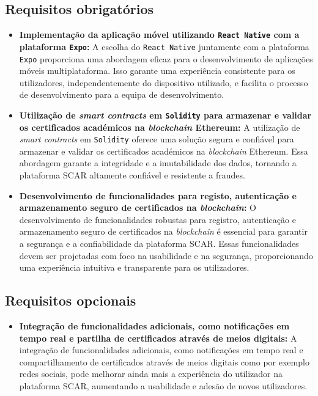 \documentclass[10pt]{article}
\begin{document}
\subsection*{Requisitos obrigatórios}

\begin{itemize}

    \item\textbf{Implementação da aplicação móvel utilizando \texttt{React Native} com a plataforma \texttt{Expo}:} A escolha do \texttt{React Native}
          juntamente com a plataforma \texttt{Expo} proporciona uma abordagem eficaz para o desenvolvimento de aplicações móveis
          multiplataforma. Isso garante uma experiência consistente para os utilizadores, independentemente do dispositivo
          utilizado, e facilita o processo de desenvolvimento para a equipa de desenvolvimento.

    \item\textbf{Utilização de \textit{smart contracts}  em \texttt{Solidity} para armazenar e validar os certificados académicos na \textit{blockchain}
              Ethereum:} A utilização de \textit{smart contracts} em \texttt{Solidity} oferece uma solução segura e confiável para armazenar
          e validar os certificados académicos na \textit{blockchain} Ethereum. Essa abordagem garante a integridade e a
          imutabilidade dos dados, tornando a plataforma SCAR altamente confiável e resistente a fraudes.

    \item\textbf{Desenvolvimento de funcionalidades para registo, autenticação e armazenamento seguro de certificados na
              \textit{blockchain}:} O desenvolvimento de funcionalidades robustas para registro, autenticação e armazenamento seguro
          de certificados na \textit{blockchain} é essencial para garantir a segurança e a confiabilidade da plataforma SCAR.\@
          Essas funcionalidades devem ser projetadas com foco na usabilidade e na segurança, proporcionando uma
          experiência intuitiva e transparente para os utilizadores.

\end{itemize}

\subsection*{Requisitos opcionais}

\begin{itemize}

    \item\textbf{Integração de funcionalidades adicionais, como notificações em tempo real e partilha de certificados
              através de meios digitais:} A integração de funcionalidades adicionais, como notificações em tempo real e
          compartilhamento de certificados através de meios digitais como por exemplo redes sociais, pode melhorar ainda mais a experiência do
          utilizador na plataforma SCAR, aumentando a usabilidade e adesão de novos utilizadores.

\end{itemize}
\end{document}
